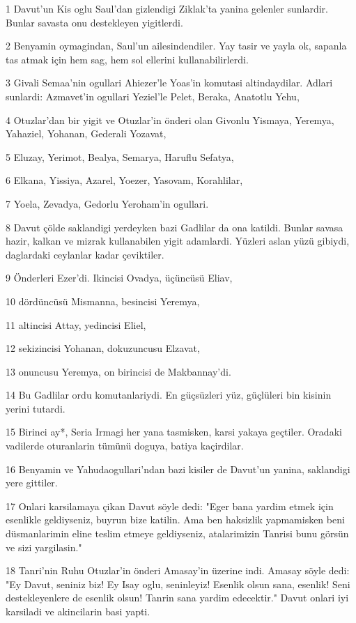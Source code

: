 \par 1 Davut'un Kis oglu Saul'dan gizlendigi Ziklak'ta yanina gelenler sunlardir. Bunlar savasta onu destekleyen yigitlerdi.
\par 2 Benyamin oymagindan, Saul'un ailesindendiler. Yay tasir ve yayla ok, sapanla tas atmak için hem sag, hem sol ellerini kullanabilirlerdi.
\par 3 Givali Semaa'nin ogullari Ahiezer'le Yoas'in komutasi altindaydilar. Adlari sunlardi: Azmavet'in ogullari Yeziel'le Pelet, Beraka, Anatotlu Yehu,
\par 4 Otuzlar'dan bir yigit ve Otuzlar'in önderi olan Givonlu Yismaya, Yeremya, Yahaziel, Yohanan, Gederali Yozavat,
\par 5 Eluzay, Yerimot, Bealya, Semarya, Haruflu Sefatya,
\par 6 Elkana, Yissiya, Azarel, Yoezer, Yasovam, Korahlilar,
\par 7 Yoela, Zevadya, Gedorlu Yeroham'in ogullari.
\par 8 Davut çölde saklandigi yerdeyken bazi Gadlilar da ona katildi. Bunlar savasa hazir, kalkan ve mizrak kullanabilen yigit adamlardi. Yüzleri aslan yüzü gibiydi, daglardaki ceylanlar kadar çeviktiler.
\par 9 Önderleri Ezer'di. Ikincisi Ovadya, üçüncüsü Eliav,
\par 10 dördüncüsü Mismanna, besincisi Yeremya,
\par 11 altincisi Attay, yedincisi Eliel,
\par 12 sekizincisi Yohanan, dokuzuncusu Elzavat,
\par 13 onuncusu Yeremya, on birincisi de Makbannay'di.
\par 14 Bu Gadlilar ordu komutanlariydi. En güçsüzleri yüz, güçlüleri bin kisinin yerini tutardi.
\par 15 Birinci ay*, Seria Irmagi her yana tasmisken, karsi yakaya geçtiler. Oradaki vadilerde oturanlarin tümünü doguya, batiya kaçirdilar.
\par 16 Benyamin ve Yahudaogullari'ndan bazi kisiler de Davut'un yanina, saklandigi yere gittiler.
\par 17 Onlari karsilamaya çikan Davut söyle dedi: "Eger bana yardim etmek için esenlikle geldiyseniz, buyrun bize katilin. Ama ben haksizlik yapmamisken beni düsmanlarimin eline teslim etmeye geldiyseniz, atalarimizin Tanrisi bunu görsün ve sizi yargilasin."
\par 18 Tanri'nin Ruhu Otuzlar'in önderi Amasay'in üzerine indi. Amasay söyle dedi: "Ey Davut, seniniz biz! Ey Isay oglu, seninleyiz! Esenlik olsun sana, esenlik! Seni destekleyenlere de esenlik olsun! Tanrin sana yardim edecektir." Davut onlari iyi karsiladi ve akincilarin basi yapti.
